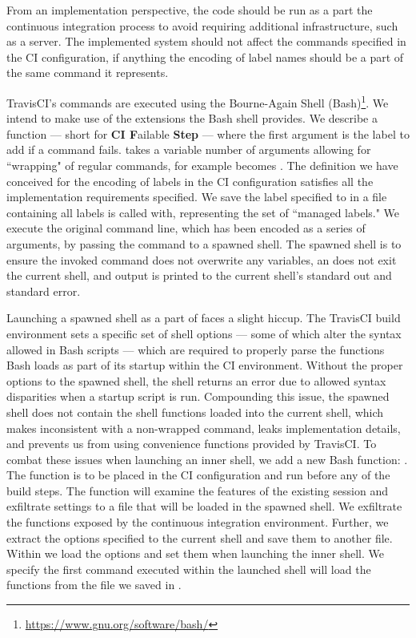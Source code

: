 {{{{{From an implementation perspective, the code should be run as a part the continuous integration process to avoid requiring additional infrastructure, such as a server. The implemented system should not affect the commands specified in the CI configuration, if anything the encoding of label names should be a part of the same command it represents. 

TravisCI's commands are executed using the Bourne-Again Shell (Bash)\footnote{\url{https://www.gnu.org/software/bash/}}. We intend to make use of the extensions the Bash shell provides. We describe a function  --- short for \textbf{CI F}ailable \textbf{Step} --- where the first argument is the label to add if a command fails.  takes a variable number of arguments allowing for ``wrapping" of regular commands, for example  becomes . The definition we have conceived for the encoding of labels in the CI configuration satisfies all the implementation requirements specified. We save the label specified to  in a file containing all labels  is called with, representing the set of ``managed labels." We execute the original command line, which has been encoded as a series of arguments, by passing the command to a spawned shell. The spawned shell is to ensure the invoked command does not overwrite any variables, an  does not exit the current shell, and output is printed to the current shell's standard out and standard error.

Launching a spawned shell as a part of  faces a slight hiccup. The TravisCI build environment sets a specific set of shell options --- some of which alter the syntax allowed in Bash scripts --- which are required to properly parse the functions Bash loads as part of its startup within the CI environment. Without the proper options to the spawned shell, the shell returns an error due to allowed syntax disparities when a startup script is run. Compounding this issue, the spawned shell does not contain the shell functions loaded into the current shell, which makes  inconsistent with a non-wrapped command, leaks implementation details, and prevents us from using convenience functions provided by TravisCI. To combat these issues when launching an inner shell, we add a new Bash function: . The function is to be placed in the CI configuration and run before any of the build steps. The function will examine the features of the existing session and exfiltrate settings to a file that will be loaded in the spawned shell. We exfiltrate the functions exposed by the continuous integration environment. Further, we extract the options specified to the current shell and save them to another file. Within  we load the options and set them when launching the inner shell. We specify the first command executed within the launched shell will load the functions from the file we saved in . 

}}}}}
